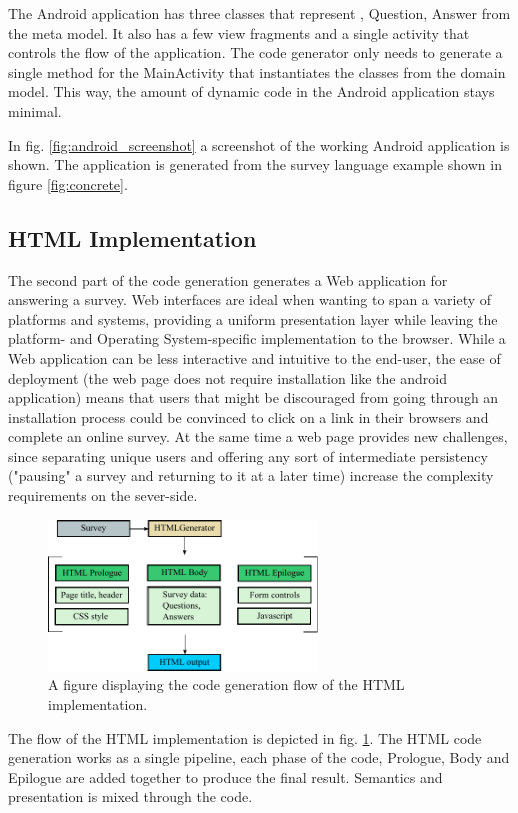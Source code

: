 \documentclass[runningheads]{llncs}
\begin{document}
The Android application has three classes that represent , \textsf{Question}, \textsf{Answer} from the meta model. It also has a few view fragments and a single activity that controls the flow of the application. The code generator only needs to generate a single method for the \textsf{MainActivity} that instantiates the classes from the domain model. This way, the amount of dynamic code in the Android application stays minimal.

In fig. \ref{fig:android_screenshot} a screenshot of the working Android application is shown. The application is generated from the survey language example shown in figure \ref{fig:concrete}.

\subsection {HTML Implementation}
The second part of the code generation generates a Web application for answering a survey. Web interfaces are ideal when wanting to span a variety of platforms and systems, providing a uniform presentation layer while leaving the platform- and Operating System-specific implementation to the browser. While a Web application can be less interactive and intuitive to the end-user, the ease of deployment (the web page does not require installation like the android application) means that users that might be discouraged from going through an installation process could be convinced to click on a link in their browsers and complete an online survey. At the same time a web page provides new challenges, since separating unique users and offering any sort of intermediate persistency ("pausing" a survey and returning to it at a later time) increase the complexity requirements on the sever-side. 
\begin{figure}
\centering
\includegraphics[height=4cm]{htmlgen}
\caption{A figure displaying the code generation flow of the HTML implementation.}
\label{fig:htmlgen}
\end{figure}
The flow of the HTML implementation is depicted in fig. \ref{fig:htmlgen}. The HTML code generation works as a single pipeline, each phase of the code, Prologue, Body and Epilogue are added together to produce the final result. Semantics and presentation is mixed through the code.  
\end{document}
